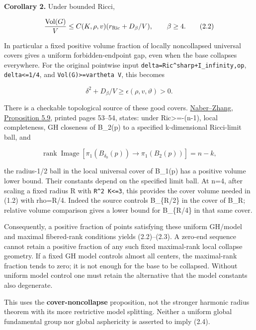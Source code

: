 \documentclass[
  10pt,
]{article}
\begin{document}
\textbf{Corollary 2.} Under bounded Ricci,

\[
 \frac{\operatorname{Vol}(G)}V
       \le C(K,\rho,v)(r_{\rm Ric}+D_\beta/V),
                          \qquad\beta\ge4.           \tag{2.2}
\]

In particular a fixed positive volume fraction of locally noncollapsed
universal covers gives a uniform forbidden-endpoint gap, even when the
base collapses everywhere. For the original pointwise input
\texttt{delta=\textbar{}\textbar{}Ric\^{}sharp+I\textbar{}\textbar{}\_infinity,op},
\texttt{delta\textless{}=1/4}, and
\texttt{Vol(G)\textgreater{}=vartheta\ V}, this becomes

\[
             \delta^2+D_\beta/V
                   \ge\epsilon(\rho,v,\vartheta)>0.  \tag{2.3}
\]

There is a checkable topological source of these good covers.
\href{https://arxiv.org/pdf/1412.1326}{Naber--Zhang, Proposition 5.9},
printed pages 53--54, states: under Ric\textgreater=-(n-1), local
completeness, GH closeness of B\_2(p) to a specified k-dimensional
Ricci-limit ball, and

\[
 \operatorname{rank}\operatorname{Image}
       [\pi_1(B_{\delta_0}(p))\longrightarrow\pi_1(B_2(p))]=n-k,
                                                        \tag{2.4}
\]

the radius-1/2 ball in the local universal cover of B\_1(p) has a
positive volume lower bound. Their constants depend on the specified
limit ball. At n=4, after scaling a fixed radius R with
\texttt{R\^{}2\ K\textless{}=3}, this provides the cover volume needed
in (1.2) with rho=R/4. Indeed the source controls B\_\{R/2\} in the
cover of B\_R; relative volume comparison gives a lower bound for
B\_\{R/4\} in that same cover.

Consequently, a positive fraction of points satisfying these uniform
GH/model and maximal fibered-rank conditions yields (2.2)--(2.3). A
zero-end sequence cannot retain a positive fraction of any such fixed
maximal-rank local collapse geometry. If a fixed GH model controls
almost all centers, the maximal-rank fraction tends to zero; it is not
enough for the base to be collapsed. Without uniform model control one
must retain the alternative that the model constants also degenerate.

This uses the \textbf{cover-noncollapse} proposition, not the stronger
harmonic radius theorem with its more restrictive model splitting.
Neither a uniform global fundamental group nor global asphericity is
asserted to imply (2.4).
\end{document}
